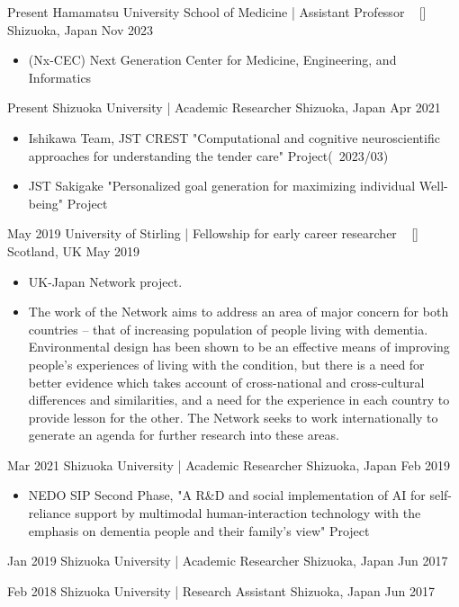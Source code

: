 
\begin{experiences}
  \researchexperience
  {Present}  {Hamamatsu University School of Medicine | Assistant Professor {\normalfont  ~ [\href{https://hama-med-nx-cec.com/}{\small{\websiteSymbol}}]
  }}{Shizuoka, Japan}{}
  {Nov 2023} {
    \begin{itemize}
      \item (Nx-CEC) Next Generation Center for Medicine, Engineering, and Informatics
    \end{itemize}
  }

  \emptySeparator
  \researchexperience
  {Present}   {Shizuoka University | Academic Researcher {}
  }{Shizuoka, Japan}{}
  {Apr 2021} {
    \begin{itemize}
      \item Ishikawa Team, JST CREST "Computational and cognitive neuroscientific approaches for understanding the tender care" Project(~2023/03)
      \item JST Sakigake "Personalized goal generation for maximizing individual Well-being" Project
    \end{itemize}
  }

  \emptySeparator
  \researchexperience
  {May 2019}   {University of Stirling | Fellowship for early career researcher {\normalfont  ~ [\href{https://www.stir.ac.uk/research/hub/contract/957552}{\small{\websiteSymbol}}]}
  }{Scotland, UK}{}
  {May 2019} {
    \begin{itemize}
      \item UK-Japan Network project.
      \item The work of the Network aims to address an area of major concern for both countries – that of increasing population of people living with dementia. Environmental design has been shown to be an effective means of improving people’s experiences of living with the condition, but there is a need for better evidence which takes account of cross-national and cross-cultural differences and similarities, and a need for the experience in each country to provide lesson for the other. The Network seeks to work internationally to generate an agenda for further research into these areas.
    \end{itemize}
  }

  \emptySeparator
  \researchexperience
  {Mar 2021}   {Shizuoka University | Academic Researcher {}
  }{Shizuoka, Japan}{}
  {Feb 2019} {
    \begin{itemize}
      \item NEDO SIP Second Phase, "A R\&D and social implementation of AI for self-reliance support by multimodal human-interaction technology with the emphasis on dementia people and their family's view" Project
    \end{itemize}
  }

  \emptySeparator
  \researchexperience
  {Jan 2019}   {Shizuoka University | Academic Researcher {}
  }{Shizuoka, Japan}{}
  {Jun 2017} {
  }

  \emptySeparator
  \researchexperience
  {Feb 2018}   {Shizuoka University | Research Assistant {}
  }{Shizuoka, Japan}{}
  {Jun 2017} {
  }

\end{experiences}
\vspace{-4mm}
